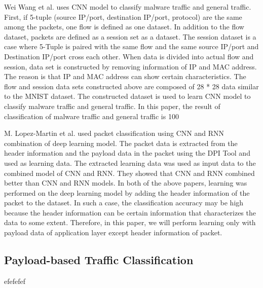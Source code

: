Wei Wang et al. uses CNN model to classify malware traffic and general traffic.
First, if 5-tuple (source IP/port, destination IP/port, protocol) are the same among the packets, one flow is defined as one dataset.
In addition to the flow dataset, packets are defined as a session set as a dataset.
The session dataset is a case where 5-Tuple is paired with the same flow and the same source IP/port and Destination IP/port cross each other.
When data is divided into actual flow and session, data set is constructed by removing information of IP and MAC address.
The reason is that IP and MAC address can show certain characteristics.
The flow and session data sets constructed above are composed of 28 * 28 data similar to the MNIST dataset.
The constructed dataset is used to learn CNN model to classify malware traffic and general traffic.
In this paper, the result of classification of malware traffic and general traffic is 100%

M. Lopez-Martin et al. used packet classification using CNN and RNN combination of deep learning model. The packet data is extracted from the header information and the payload data in the packet using the DPI Tool and used as learning data. The extracted learning data was used as input data to the combined model of CNN and RNN. They showed that CNN and RNN combined better than CNN and RNN models.
In both of the above papers, learning was performed on the deep learning model by adding the header information of the packet to the dataset. In such a case, the classification accuracy may be high because the header information can be certain information that characterizes the data to some extent. Therefore, in this paper, we will perform learning only with payload data of application layer except header information of packet.

\subsection{Payload-based Traffic Classification}\label{subsec:payloadbased}
efefefef